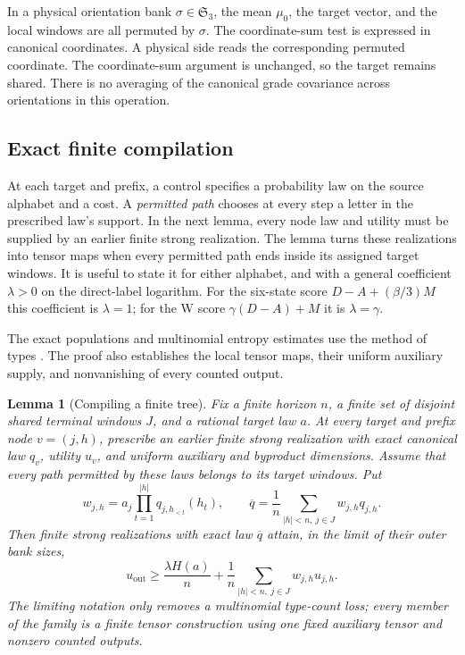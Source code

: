 \documentclass[11pt]{article}
\numberwithin{equation}{section}
\newtheorem{lemma}[theorem]{Lemma}
\theoremstyle{definition}
\theoremstyle{remark}
\begin{document}
In a physical orientation bank \(\sigma\in\mathfrak S_3\), the mean
\(\mu_0\), the target vector, and the local windows are all permuted
by \(\sigma\).  The coordinate-sum test is expressed in canonical
coordinates.  A physical side reads the corresponding
permuted coordinate.  The coordinate-sum argument is unchanged, so
the target remains shared.  There is no averaging of the canonical
grade covariance across orientations in this operation.

\subsection{Exact finite compilation}

At each target and prefix, a control specifies a probability law on the
source alphabet and a cost.  A
\emph{permitted path} chooses at every step a letter in the prescribed
law's support.  In the next lemma, every node law and utility must be
supplied by an earlier finite strong realization.  The lemma turns these
realizations into tensor maps when every permitted path ends inside its
assigned target windows.
It is useful to state it for either alphabet, and with a general coefficient
\(\lambda>0\) on the direct-label logarithm.  For the six-state score
\(D-A+(\beta/3)M\) this coefficient is \(\lambda=1\); for the
W score \(\gamma(D-A)+M\) it is \(\lambda=\gamma\).

The exact populations and multinomial entropy estimates use the method
of types \cite[Section~II]{csiszar1998}.  The proof also establishes
the local tensor maps, their uniform auxiliary supply, and nonvanishing
of every counted output.

\begin{lemma}[Compiling a finite tree]\label{lem:compile}
Fix a finite horizon \(n\), a finite set of disjoint shared terminal
windows \(J\), and a rational target law \(a\).  At every target and
prefix node \(v=(j,h)\), prescribe an earlier finite strong realization
with exact canonical law \(q_v\), utility \(u_v\), and uniform auxiliary
and byproduct dimensions.  Assume that every path permitted by these
laws belongs to its target windows.  Put
\[
 w_{j,h}=a_j\prod_{t=1}^{|h|}q_{j,h_{<t}}(h_t),
 \qquad
 \overline q=\frac1n\sum_{|h|<n,\ j\in J}w_{j,h}q_{j,h}.
\]
Then finite strong realizations with exact law \(\overline q\) attain,
in the limit of their outer bank sizes,
\begin{equation}\label{ap:compile-score}
 u_{\mathrm{out}}
 \geq\frac{\lambda H(a)}n
      +\frac1n\sum_{|h|<n,\ j\in J}w_{j,h}u_{j,h}.
\end{equation}
The limiting notation only removes a multinomial type-count loss;
every member of the family is a finite tensor construction using one
fixed auxiliary tensor and nonzero counted outputs.
\end{lemma}
\end{document}
